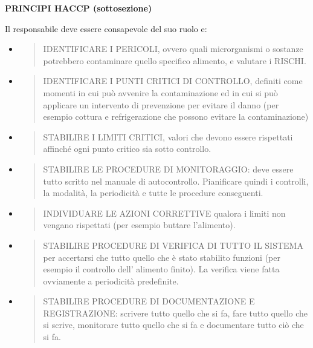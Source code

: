 \documentclass[]{article}
\begin{document}
\textbf{PRINCIPI HACCP (sottosezione)}

Il responsabile deve essere consapevole del suo ruolo e:

\begin{itemize}
\item
  \begin{quote}
  IDENTIFICARE I PERICOLI, ovvero quali microrganismi o sostanze
  potrebbero contaminare quello specifico alimento, e valutare i RISCHI.
  \end{quote}
\item
  \begin{quote}
  IDENTIFICARE I PUNTI CRITICI DI CONTROLLO, definiti come momenti in
  cui può avvenire la contaminazione ed in cui si può applicare un
  intervento di prevenzione per evitare il danno (per esempio cottura e
  refrigerazione che possono evitare la contaminazione)
  \end{quote}
\item
  \begin{quote}
  STABILIRE I LIMITI CRITICI, valori che devono essere rispettati
  affinché ogni punto critico sia sotto controllo.
  \end{quote}
\item
  \begin{quote}
  STABILIRE LE PROCEDURE DI MONITORAGGIO: deve essere tutto scritto nel
  manuale di autocontrollo. Pianificare quindi i controlli, la modalità,
  la periodicità e tutte le procedure conseguenti.
  \end{quote}
\item
  \begin{quote}
  INDIVIDUARE LE AZIONI CORRETTIVE qualora i limiti non vengano
  rispettati (per esempio buttare l'alimento).
  \end{quote}
\item
  \begin{quote}
  STABILIRE PROCEDURE DI VERIFICA DI TUTTO IL SISTEMA per accertarsi che
  tutto quello che è stato stabilito funzioni (per esempio il controllo
  dell' alimento finito). La verifica viene fatta ovviamente a
  periodicità predefinite.
  \end{quote}
\item
  \begin{quote}
  STABILIRE PROCEDURE DI DOCUMENTAZIONE E REGISTRAZIONE: scrivere tutto
  quello che si fa, fare tutto quello che si scrive, monitorare tutto
  quello che si fa e documentare tutto ciò che si fa.
  \end{quote}
\end{itemize}
\end{document}
